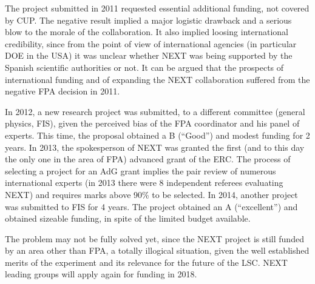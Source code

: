 The project submitted in 2011 requested essential additional funding, not covered by CUP. The negative result implied a major logistic drawback and a serious blow to the morale of the collaboration. It also implied loosing international credibility, since from the point of view of international agencies (in particular DOE in the USA) it was unclear whether NEXT was being supported by the Spanish scientific authorities or not. It can be argued that the prospects of international funding and of expanding the NEXT collaboration suffered from the negative FPA decision in 2011. 

In 2012, a new research project was submitted, to a different committee (general physics, FIS), given the perceived bias of the FPA coordinator and his panel of experts. This time, the proposal  obtained a B (``Good'') and modest funding for 2 years. In 2013, the spokesperson of NEXT was granted the first (and to this day the only one in the area of FPA) advanced grant of the ERC. The process of selecting a project for an AdG grant implies the pair review of numerous international experts (in 2013 there were 8 independent referees evaluating NEXT) and requires marks above 90\% to be selected. In 2014, another project was submitted to FIS for 4 years. The project obtained an A (``excellent'') and obtained sizeable funding, in spite of the limited budget available. 

The problem may not be fully solved yet, since the NEXT project is still funded by an area other than FPA, a totally illogical situation, given the well established merits of the experiment and its relevance for the future of the LSC. NEXT leading groups will apply again for funding in 2018.  

 

